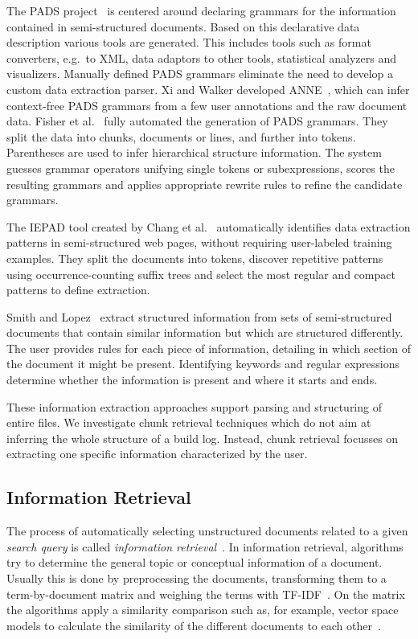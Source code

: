 \documentclass[\myrootdir/main.tex]{subfiles}
\begin{document}
The PADS project~\cite{fisher2011the-pads} is centered around declaring grammars for the information contained in semi-structured documents.
Based on this declarative data description various tools are generated.
This includes tools such as format converters, e.g.\ to XML, data adaptors to other tools, statistical analyzers and visualizers.
Manually defined PADS grammars eliminate the need to develop a custom data extraction parser.
Xi and Walker developed ANNE~\cite{xi2010a-context-free}, which can infer context-free PADS grammars from a few user annotations and the raw document data.
Fisher et al.~\cite{fisher2008from} fully automated the generation of PADS grammars.
They split the data into chunks, documents or lines, and further into tokens.
Parentheses are used to infer hierarchical structure information.
The system guesses grammar operators unifying single tokens or subexpressions, scores the resulting grammars and applies appropriate rewrite rules to refine the candidate grammars.

The IEPAD tool created by Chang et al.~\cite{chang2003automatic} automatically identifies data extraction patterns in semi-structured web pages, without requiring user-labeled training examples.
They split the documents into tokens, discover repetitive patterns using occurrence-counting suffix trees and select the most regular and compact patterns to define extraction.

Smith and Lopez~\cite{smith1997information} extract structured information from sets of semi-structured documents that contain similar information but which are structured differently.
The user provides rules for each piece of information, detailing in which section of the document it might be present.
Identifying keywords and regular expressions determine whether the information is present and where it starts and ends.

These information extraction approaches support parsing and structuring of entire files.
We investigate chunk retrieval techniques which do not aim at inferring the whole structure of a build log.
Instead, chunk retrieval focusses on extracting one specific information characterized by the user.

\subsection{Information Retrieval}%
The process of automatically selecting unstructured documents related to a given \emph{search query} is called \emph{information retrieval}~\cite{schutze2008introduction}.
In information retrieval, algorithms try to determine the general topic or conceptual information of a document.
Usually this is done by preprocessing the documents, transforming them to a term-by-document matrix and weighing the terms with TF-IDF~\cite{lee1997document}.
On the matrix the algorithms apply a similarity comparison such as, for example, vector space models to calculate the similarity of the different documents to each other~\cite{panichella2016parameterizing}.
\end{document}
